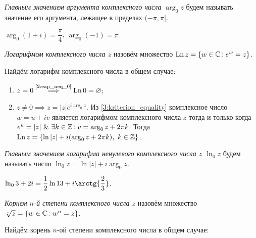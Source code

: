 \begin{definition}
\textit{Главным значением аргумента комплексного числа \(\arg_0{z}\)} будем называть значение его
аргумента, лежащее в пределах \((-\pi, \pi]\).
\end{definition}
\begin{example}
\(\arg_0{(1+i)} = \dfrac{\pi}{4}\), \(\arg_0{(-1)} = \pi\)
\end{example}


\begin{definition}
\textit{Логарифмом комплексного числа \(z\)} назовём множество \(\operatorname{Ln}{z} = \{w \in \mathbb{C} \colon e^w =
z\}\).
\end{definition}

Найдём логарифм комплексного числа в общем случае:

\begin{enumerate}
\item \(z = 0 \overset{\text{\ref{2:exp_neq_0}}}{\implies} \operatorname{Ln} 0 = \varnothing\);
\item \(z \neq 0 \implies z = |z|e^{i\arg_0{z}}\). Из \ref{3:kriterion_equality} комплексное число
    \(w = u + iv\) является логарифмом комплексного числа \(z\) тогда и только когда \(e^u = |z| \
    \& \ \exists k \in \mathbb{Z} \colon v = \arg_0{z} + 2 \pi k\). Тогда \(\operatorname{Ln}{z} = \{\ln{|z|} + i(\arg_0{z}
    + 2\pi k), \ k \in \mathbb{Z}\}\).
\end{enumerate}

\begin{definition}
\textit{Главным значением логарифма ненулевого комплексного числа \(z\) \(\ln_0{z}\)} будем называть
число \(\ln_0{z} = \ln{|z|} + i \arg_0{z}\).
\end{definition}

\begin{example}
\(\ln_0{3 + 2i} = \dfrac{1}{2} \ln{13} + i\arctg{\dfrac{2}{3}}\).
\end{example}

\begin{definition}
\textit{Корнем \(n\)-й степени комплексного числа \(z\)} назовём множество \(\sqrt[n]{z} = \{w \in
\mathbb{C} \colon w^n = z\}\).
\end{definition}

Найдём корень $n$-ой степени комплексного числа в общем случае:

